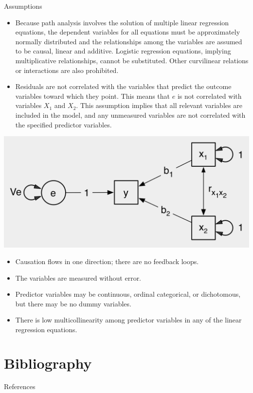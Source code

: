 \documentclass[11pt,dvipsnames,ignorenonframetext,aspectratio=169]{beamer}
\begin{document}
\begin{frame}{Assumptions}
\protect\hypertarget{assumptions}{}
\begin{itemize}
\item
  Because path analysis involves the solution of multiple linear
  regression equations, the dependent variables for all equations must
  be approximately normally distributed and the relationships among the
  variables are assumed to be causal, linear and additive. Logistic
  regression equations, implying multiplicative relationships, cannot be
  substituted. Other curvilinear relations or interactions are also
  prohibited.
\item
  Residuals are not correlated with the variables that predict the
  outcome variables toward which they point. This means that \(e\) is
  not correlated with variables \(X_1\) and \(X_2\). This assumption
  implies that all relevant variables are included in the model, and any
  unmeasured variables are not correlated with the specified predictor
  variables.
\end{itemize}

\includegraphics[width=0.8\linewidth]{../images/residual_independence}
\end{frame}

\begin{frame}{}
\protect\hypertarget{section-8}{}
\begin{itemize}
\item
  Causation flows in one direction; there are no feedback loops.
\item
  The variables are measured without error.
\item
  Predictor variables may be continuous, ordinal categorical, or
  dichotomous, but there may be no dummy variables.
\item
  There is low multicollinearity among predictor variables in any of the
  linear regression equations.
\end{itemize}
\end{frame}

\hypertarget{bibliography}{%
\section{Bibliography}\label{bibliography}}

\begin{frame}{References}
\protect\hypertarget{references}{}
\end{frame}
\end{document}
